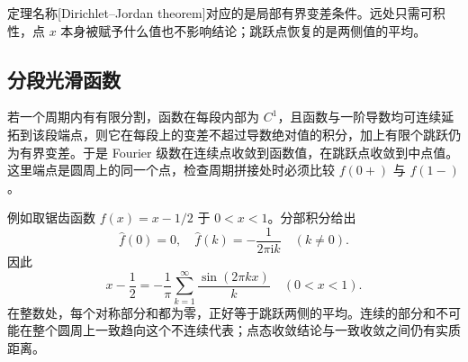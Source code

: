 定理名称[Dirichlet--Jordan theorem]对应的是局部有界变差条件。远处只需可积性，点 \(x\) 本身被赋予什么值也不影响结论；跳跃点恢复的是两侧值的平均。

\subsection{分段光滑函数}
\label{b2:subsec:020204}

若一个周期内有有限分割，函数在每段内部为 \(C^1\)，且函数与一阶导数均可连续延拓到该段端点，则它在每段上的变差不超过导数绝对值的积分，加上有限个跳跃仍为有界变差。于是 Fourier 级数在连续点收敛到函数值，在跳跃点收敛到中点值。这里端点是圆周上的同一个点，检查周期拼接处时必须比较 \(f(0+)\) 与 \(f(1-)\)。

\ProseParagraphBreak

例如取锯齿函数 \(f(x)=x-1/2\) 于 \(0<x<1\)。分部积分给出
\[
 \widehat f(0)=0,\quad \widehat f(k)=-\dfrac1{2\pi\mathrm{i}k}\quad(k\ne0).
\]
因此
\[
 x-\dfrac12=-\dfrac1\pi\sum_{k=1}^\infty\dfrac{\sin(2\pi kx)}k
 \quad(0<x<1).
\]
在整数处，每个对称部分和都为零，正好等于跳跃两侧的平均。连续的部分和不可能在整个圆周上一致趋向这个不连续代表；点态收敛结论与一致收敛之间仍有实质距离。
